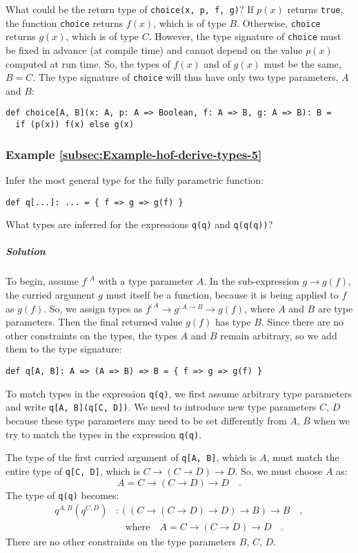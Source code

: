 What could be the return type of \lstinline!choice(x, p, f, g)!?
If $p(x)$ returns \lstinline!true!, the function \lstinline!choice!
returns $f(x)$, which is of type $B$. Otherwise, \lstinline!choice!
returns $g(x)$, which is of type $C$. However, the type signature
of \lstinline!choice! must be fixed in advance (at compile time)
and cannot depend on the value $p(x)$ computed at run time. So, the
types of $f(x)$ and of $g(x)$ must be the same, $B=C$. The type
signature of \lstinline!choice! will thus have only two type parameters,
$A$ and $B$:
\begin{lstlisting}
def choice[A, B](x: A, p: A => Boolean, f: A => B, g: A => B): B =
  if (p(x)) f(x) else g(x)
\end{lstlisting}


\subsubsection{Example \label{subsec:Example-hof-derive-types-5}\ref{subsec:Example-hof-derive-types-5}}

Infer the most general type for the fully parametric function:
\begin{lstlisting}
def q[...]: ... = { f => g => g(f) }
\end{lstlisting}
What types are inferred for the expressions \lstinline!q(q)! and
\lstinline!q(q(q))!?

\subparagraph{Solution}

To begin, assume $f^{:A}$ with a type parameter $A$. In the sub-expression
$g\rightarrow g(f)$, the curried argument $g$ must itself be a function,
because it is being applied to $f$ as $g(f)$. So, we assign types
as $f^{:A}\rightarrow g^{:A\rightarrow B}\rightarrow g(f)$, where
$A$ and $B$ are type parameters. Then the final returned value $g(f)$
has type $B$. Since there are no other constraints on the types,
the types $A$ and $B$ remain arbitrary, so we add them to the type
signature:
\begin{lstlisting}
def q[A, B]: A => (A => B) => B = { f => g => g(f) }
\end{lstlisting}

To match types in the expression \lstinline!q(q)!, we first assume
arbitrary type parameters and write \lstinline!q[A, B](q[C, D])!.
We need to introduce new type parameters $C$, $D$ because these
type parameters may need to be set differently from $A$, $B$ when
we try to match the types in the expression \lstinline!q(q)!.

The type of the first curried argument of \lstinline!q[A, B]!, which
is $A$, must match the entire type of \lstinline!q[C, D]!, which
is $C\rightarrow\left(C\rightarrow D\right)\rightarrow D$. So, we
must choose $A$ as:
\[
A=C\rightarrow\left(C\rightarrow D\right)\rightarrow D\quad.
\]
The type of \lstinline!q(q)! becomes:
\begin{align*}
q^{A,B}(q^{C,D}) & :\left(\left(C\rightarrow\left(C\rightarrow D\right)\rightarrow D\right)\rightarrow B\right)\rightarrow B\quad,\\
 & \quad\text{where}\quad A=C\rightarrow\left(C\rightarrow D\right)\rightarrow D\quad.
\end{align*}
There are no other constraints on the type parameters $B$, $C$,
$D$.

